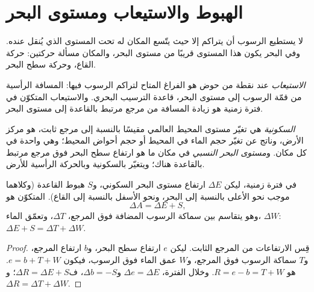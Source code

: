 \section{الهبوط والاستيعاب ومستوى البحر}\label{sec:b1:diagenesis-basins:accommodation}

لا يستطيع الرسوب أن يتراكم إلا حيث يتّسع المكان له تحت المستوى الذي يُنقل عنده. وفي البحر يكون هذا المستوى قريبًا من مستوى البحر، والمكان مسألة حركتين: حركة القاع، وحركة سطح البحر.

\begin{definition}[الاستيعاب]\label{def:b1:diagenesis-basins:accommodation}
\emph{الاستيعاب} عند نقطة من حوض هو الفراغ المتاح لتراكم الرسوب فيها: المسافة الرأسية من قمّة الرسوب إلى مستوى البحر، قاعدة الترسيب البحري. والاستيعاب المتكوّن في فترة زمنية هو زيادة المسافة من مرجع مرتبط بالقاعدة إلى مستوى البحر.
\end{definition}

\begin{definition}\label{def:b1:diagenesis-basins:eustasy}
\emph{السكونية} هي تغيّر مستوى المحيط العالمي مقيسًا بالنسبة إلى مرجع ثابت، هو مركز الأرض، وناتج عن تغيّر حجم الماء في المحيط أو حجم أحواض المحيط؛ وهي واحدة في كل مكان. و\emph{مستوى البحر النسبي} في مكان ما هو ارتفاع سطح البحر فوق مرجع مرتبط بالقاعدة هناك؛ ويتغيّر بالسكونية وبالحركة الرأسية للأرض.
\end{definition}

\begin{proposition}\label{prop:b1:diagenesis-basins:budget}
في فترة زمنية، ليكن $\Delta E$ ارتفاع مستوى البحر السكوني، و$S$ هبوط القاعدة (وكلاهما موجب نحو الأعلى بالنسبة إلى البحر، ونحو الأسفل بالنسبة إلى القاع).  المتكوّن هو
\[
  \Delta A = \Delta E + S ,
\]
وهو يتقاسم بين سماكة الرسوب المضافة فوق المرجع، $\Delta T$، وتعمّق الماء، $\Delta W$:
$\Delta E + S = \Delta T + \Delta W$.
\end{proposition}

\begin{proof}
قِس الارتفاعات من المرجع الثابت. ليكن $e$ ارتفاع سطح البحر، و$b$ ارتفاع المرجع، و$T$ سماكة الرسوب فوق المرجع، و$W$ عمق الماء فوق الرسوب، فيكون $e = b + T + W$.  هو $R = e - b = T + W$. وخلال الفترة، $\Delta e =
\Delta E$ و$\Delta b = -S$، ف$\Delta R = \Delta E + S$؛ و$\Delta R =
\Delta T + \Delta W$.
\end{proof}

